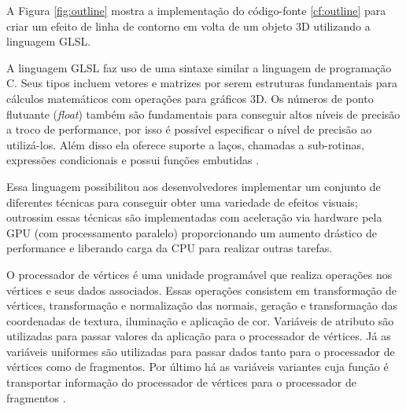 A Figura \ref{fig:outline} mostra a implementação do código-fonte \ref{cf:outline} para criar um efeito de linha de contorno em volta de um objeto 3D utilizando a linguagem GLSL.

\phantom{a}

\phantom{a}

\begin{figure}[h!]
	\centering
\end{figure}

A linguagem GLSL faz uso de uma sintaxe similar a linguagem de programação C. Seus tipos incluem vetores e matrizes por serem estruturas fundamentais para cálculos matemáticos com operações para gráficos 3D. Os números de ponto flutuante (\textit{float}) também são fundamentais para conseguir altos níveis de precisão a troco de performance, por isso é possível especificar o nível de precisão ao utilizá-los. Além disso ela oferece suporte a laços, chamadas a sub-rotinas, expressões condicionais e possui funções embutidas \cite{GLSLBook}. 

Essa linguagem possibilitou aos desenvolvedores implementar um conjunto de diferentes técnicas para conseguir obter uma variedade de efeitos visuais; outrossim essas técnicas são implementadas com aceleração via hardware pela GPU (com processamento paralelo) proporcionando um aumento drástico de performance e liberando carga da CPU para realizar outras tarefas.

O processador de vértices é uma unidade programável que realiza operações nos vértices e seus dados associados. Essas operações consistem em transformação de vértices, transformação e normalização das normais, geração e transformação das coordenadas de textura, iluminação e aplicação de cor. Variáveis de atributo são utilizadas para passar valores da aplicação para o processador de vértices. Já as variáveis uniformes são utilizadas para passar dados tanto para o processador de vértices como de fragmentos. Por último há as variáveis variantes cuja função é transportar informação do processador de vértices para o processador de fragmentos \cite{GLSLBook}.

